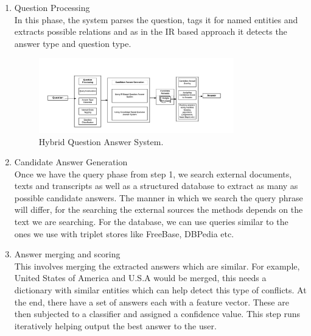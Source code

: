 \begin{enumerate}

\item Question Processing \\
In this phase, the system parses the question, tags it for named entities and extracts possible relations and as in the IR based approach it detects the answer type and question type.

\begin{figure}[htb]
\centering
\includegraphics[width=0.8\textwidth]{images/Hybrid_QA.jpg}
\caption{Hybrid Question Answer System.} 
\label{fig:Hybrid_QA}
\end{figure}

\item Candidate Answer Generation \\
Once we have the query phase from step 1, we search external documents, texts and transcripts as well as a structured database to extract as many as possible candidate answers. The manner in which we search the query phrase will differ, for the searching the external sources the methods depends on the text we are searching. For the database, we can use queries similar to the ones we use with triplet stores like FreeBase, DBPedia etc.

\item Answer merging and scoring \\
This involves merging the extracted answers which are similar. For example, United States of America and U.S.A would be merged, this needs a dictionary with similar entities which can help detect this type of conflicts. At the end, there have a set of answers each with a feature vector. These are then subjected to a classifier and assigned a confidence value. This step runs iteratively helping output the best answer to the user.

 \end{enumerate}